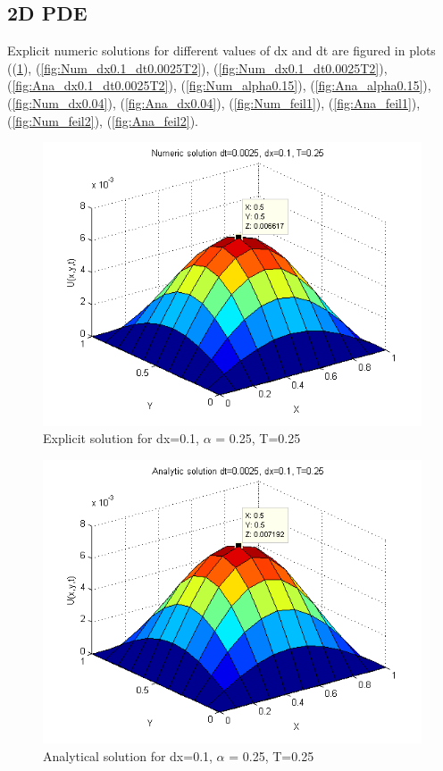 \documentclass[a4paper,10pt]{article}
\begin{document}
\subsection{2D PDE}
Explicit numeric solutions for different values of dx and dt are figured in plots ((\ref{fig:Num_dx0.1_dt0.0025T1}), (\ref{fig:Num_dx0.1_dt0.0025T2}), (\ref{fig:Num_dx0.1_dt0.0025T2}), (\ref{fig:Ana_dx0.1_dt0.0025T2}), (\ref{fig:Num_alpha0.15}), (\ref{fig:Ana_alpha0.15}), (\ref{fig:Num_dx0.04}), (\ref{fig:Ana_dx0.04}), (\ref{fig:Num_feil1}), (\ref{fig:Ana_feil1}), (\ref{fig:Num_feil2}), (\ref{fig:Ana_feil2}).
\begin{figure}
  \begin{center}
    \includegraphics[scale=0.5]{num_dt00025_dx01_T025}
    \caption{Explicit solution for dx=0.1, $\alpha$ = 0.25, T=0.25}
    \label{fig:Num_dx0.1_dt0.0025T1}
  \end{center}

\end{figure}

\begin{figure}
  \begin{center}
    \includegraphics[scale=0.5]{ana_dt00025_dx01_T025}
    \caption{Analytical solution for dx=0.1, $\alpha$ = 0.25, T=0.25}
    \label{fig:Ana_dx0.1_dt0.0025T1}
  \end{center}
\end{figure}
\end{document}
